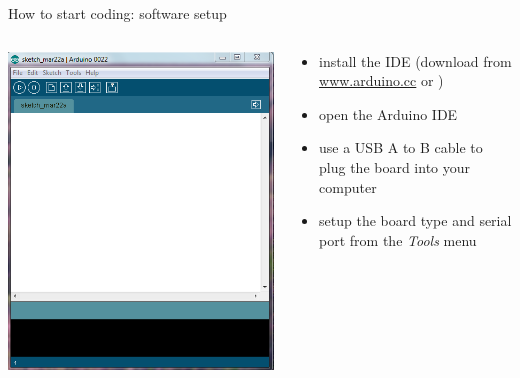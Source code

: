 \documentclass[compress]{beamer}
\begin{document}
    \begin{frame}{How to start coding: software setup}
        \begin{columns}
            \begin{column}{0.5\linewidth}
                \begin{center}
                    \includegraphics[width=0.9\linewidth]{arduino-ide}
                \end{center}
            \end{column}
            \begin{column}{0.5\linewidth}
                \begin{itemize}
                    \item install the IDE (download from \url{www.arduino.cc} or
                        )
                    \item open the Arduino IDE
                    \item use a USB A to B cable to plug the board into your
                        computer
                    \item setup the board type and serial port from the
                        \emph{Tools} menu
                \end{itemize}
            \end{column}
        \end{columns}
    \end{frame}
\end{document}
